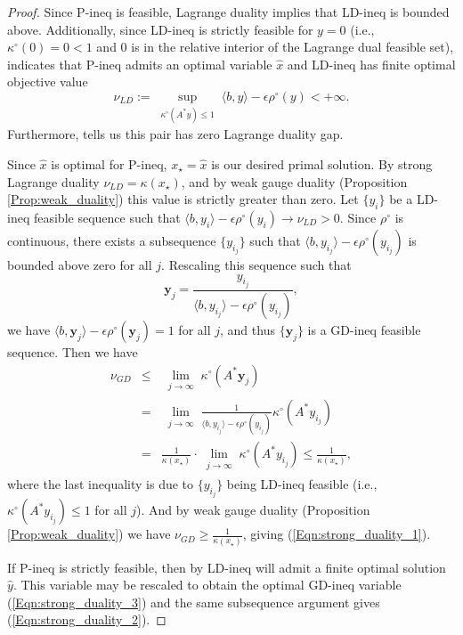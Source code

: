 \begin{proof}
Since P-ineq is feasible, Lagrange duality implies that LD-ineq is bounded above.  Additionally, since LD-ineq is strictly feasible for $y=0$ (i.e., $\kappa^\circ(0) = 0< 1$ and $0$ is in the relative interior of the Lagrange dual feasible set), \cite[Theorem 28.2]{rockafellar1970convex} indicates that P-ineq admits an optimal variable $\hat{x}$ and LD-ineq has finite optimal objective value  
\begin{equation*}
\nu_{LD} := \sup\limits_{\substack{\kappa^\circ(A^*y) \leq 1}} \langle b, y \rangle - \epsilon \rho^\circ(y)  < +\infty.
\end{equation*}
Furthermore, \cite[Theorem 28.4]{rockafellar1970convex} tells us this pair has zero Lagrange duality gap.

Since $\hat{x}$ is optimal for P-ineq, $x_\star = \hat{x}$ is our desired primal solution.  By strong Lagrange duality $\nu_{LD} = \kappa(x_\star)$,  and by weak gauge duality (Proposition \ref{Prop:weak_duality}) this value is strictly greater than zero.  Let $\{ y_i \}$ be a LD-ineq feasible sequence such that $\langle b, y_i \rangle - \epsilon \rho^\circ(y_i) \rightarrow \nu_{LD} > 0$.  Since $\rho^\circ$ is continuous, there exists a subsequence $\{ y_{i_j} \}$ such that $\langle b, y_{i_j} \rangle - \epsilon \rho^\circ(y_{i_j}) $ is bounded above zero for all $j$.  Rescaling this sequence such that
\begin{equation*}
\mathbf{y}_j = \frac{y_{i_j}}{\langle b, y_{i_j} \rangle - \epsilon \rho^\circ(y_{i_j})},
\end{equation*}
we have $\langle b, \mathbf{y}_j \rangle - \epsilon \rho^\circ(\mathbf{y}_j) = 1$ for all $j$, and thus $\{ \mathbf{y}_j \}$ is a GD-ineq feasible sequence.  Then we have
\begin{equation*}
\begin{array}{rcl}
\nu_{GD} &	\leq & \lim\limits_{\substack{j \rightarrow \infty}} \kappa^\circ(A^* \mathbf{y}_j)	\\
	&	=	&	\lim\limits_{\substack{j \rightarrow \infty}}  \frac{1}{ \langle b, y_{i_j} \rangle - \epsilon \rho^\circ(y_{i_j})} \kappa^\circ(A^*y_{i_j}) \\
	&	=	&	\frac{1}{\kappa(x_\star)} \cdot \lim\limits_{\substack{j \rightarrow \infty}}  \kappa^\circ(A^*y_{i_j}) \leq \frac{1}{\kappa(x_\star)},
\end{array}
\end{equation*}
where the last inequality is due to $\{ y_{i_j} \}$ being LD-ineq feasible (i.e., $\kappa^\circ(A^*y_{i_j}) \leq 1$ for all $j$).  And by weak gauge duality (Proposition \ref{Prop:weak_duality}) we have $\nu_{GD} \geq \frac{1}{\kappa(x_\star)}$, giving (\ref{Eqn:strong_duality_1}).

If P-ineq is strictly feasible, then by \cite[Theorem 28.2]{rockafellar1970convex} LD-ineq will admit a finite optimal solution $\hat{y}$. This variable may be rescaled to obtain the optimal GD-ineq variable (\ref{Eqn:strong_duality_3}) and the same subsequence argument gives (\ref{Eqn:strong_duality_2}).

\end{proof}
